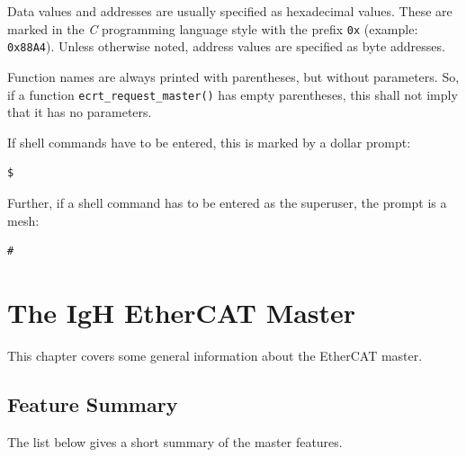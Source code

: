 \documentclass[a4paper,12pt,BCOR6mm,bibtotoc,idxtotoc]{scrbook}
\begin{document}
Data values and addresses are usually specified as hexadecimal values. These
are marked in the \textit{C} programming language style with the prefix
\lstinline+0x+ (example: \lstinline+0x88A4+). Unless otherwise noted, address
values are specified as byte addresses.

Function names are always printed with parentheses, but without
parameters. So, if a function \lstinline+ecrt_request_master()+ has
empty parentheses, this shall not imply that it has no parameters.

If shell commands have to be entered, this is marked by a dollar prompt:

\begin{lstlisting}
$
\end{lstlisting}

Further, if a shell command has to be entered as the superuser, the
prompt is a mesh:

\begin{lstlisting}
#
\end{lstlisting}


\chapter{The IgH EtherCAT Master}
\label{chapter:master}

This chapter covers some general information about the EtherCAT master.


\section{Feature Summary}
\label{sec:summary}

The list below gives a short summary of the master features.
\end{document}
